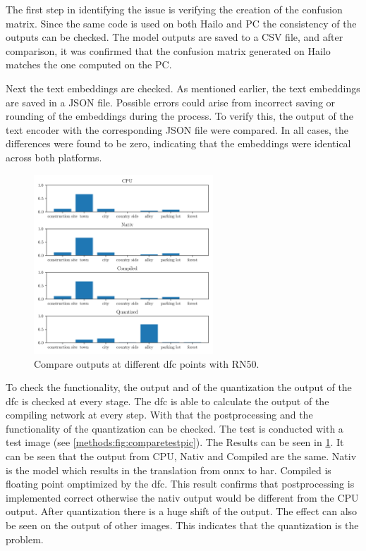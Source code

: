 The first step in identifying the issue is verifying the creation of the confusion matrix.
Since the same code is used on both Hailo and PC the consistency of the outputs can be checked.
The model outputs are saved to a CSV file, and after comparison, it was confirmed that the confusion matrix generated on Hailo matches the one computed on the PC.

Next the text embeddings are checked.
As mentioned earlier, the text embeddings are saved in a JSON file.
Possible errors could arise from incorrect saving or rounding of the embeddings during the process.
To verify this, the output of the text encoder with the corresponding JSON file were compared.
In all cases, the differences were found to be zero, indicating that the embeddings were identical across both platforms.

\begin{figure}[h]
    \centering
    \includegraphics[width=0.6\textwidth]{Images/Implementation/compareProbs_RN50.png}
    \caption{Compare outputs at different \acrshort{dfc} points with RN50.}
    \label{methods:fig:comparern50}
\end{figure}

To check the functionality, the output and of the quantization the output of the \acrshort{dfc} is checked at every stage.
The \acrshort{dfc} is able to calculate the output of the compiling network at every step.
With that the postprocessing and the functionality of the quantization can be checked.
The test is conducted with a test image (see \cref{methods:fig:comparetestpic}).
The Results can be seen in \cref{methods:fig:comparern50}.
It can be seen that the output from CPU, Nativ and Compiled are the same.
Nativ is the model which results in the translation from onnx to \acrshort{har}.
Compiled is floating point omptimized by the \acrshort{dfc}.
This result confirms that postprocessing is implemented correct otherwise the nativ output would be different from the CPU output.
After quantization there is a huge shift of the output.
The effect can also be seen on the output of other images.
This indicates that the quantization is the problem.

